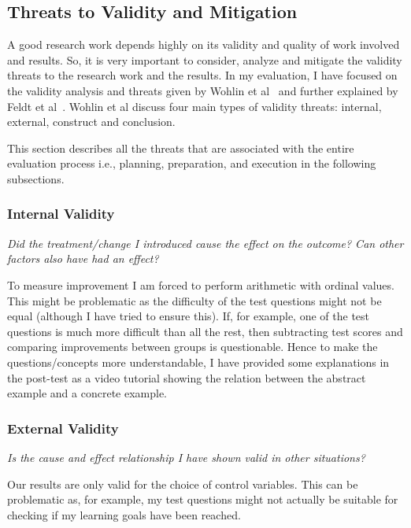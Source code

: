 \subsection{Threats to Validity and Mitigation}\label{subsec:threats&mitigation}
A good research work depends highly on its validity and quality of work involved and results. So, it is very important to consider, analyze and mitigate the validity threats to the research work and the results. In my evaluation, I have focused on the validity analysis and threats given by Wohlin et al~\cite{expinse} and further explained by Feldt et al~\cite{validitythreatsinse}. Wohlin et al discuss four main types of validity threats: internal, external, construct and conclusion. 

This section describes all the threats that are associated with the entire evaluation process i.e., planning, preparation, and execution in the following subsections.
 
\subsubsection{Internal Validity}\label{subsubsec:internalvalidity}
\emph{Did the treatment/change I introduced cause the effect on the outcome? Can other factors also have had an effect?}

\medskip
\noindent To measure improvement I am forced to perform arithmetic with ordinal values.
This might be problematic as the difficulty of the test questions might not be equal (although I have tried to ensure this). If, for example, one of the test questions is much more difficult than all the rest, then subtracting test scores and comparing improvements between groups is questionable. Hence to make the questions/concepts more understandable, I have provided some explanations in the post-test as a video tutorial showing the relation between the abstract example and a concrete example.

\subsubsection{External Validity}\label{subsubsec:externalvalidity}
\emph{Is the cause and effect relationship I have shown valid in other situations?}

\medskip
\noindent Our results are only valid for the choice of control variables.
This can be problematic as, for example, my test questions might not actually be suitable for checking if my learning goals have been reached.

